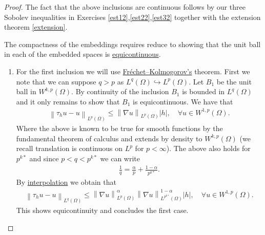 \documentclass[12pt]{article}
\theoremstyle{remark}
\renewcommand{\norm}[1]{\left\lVert #1 \right\rVert}\renewcommand{\abs}[1]{\left| #1 \right|}
\begin{document}
\begin{proof}
	The fact that the above inclusions are continuous follows by our three Sobolev inequalities in Exercises \ref{est12},\ref{est22},\ref{est32} together with the extension theorem \ref{extension}.

	The compactness of the embeddings requires reduce to showing that the unit ball in each of the embedded spaces is \href{https://en.wikipedia.org/wiki/Equicontinuity}{equicontinuous}.
	\begin{enumerate}
		\item     For the first inclusion we will use \href{https://en.wikipedia.org/wiki/Fr%C3%A9chet%E2%80%93Kolmogorov_theorem}{Fréchet–Kolmogorov's} theorem. First we note that we can suppose $q>p$ as  $L^q(\Omega) \hookrightarrow L^p(\Omega)$. Let $B_1$ be the unit ball in $W^{k,p}(\Omega)$. By continuity of the inclusion $B_1$ is bounded in $L^q(\Omega)$ and it only remains to show that  $B_1$ is equicontinuous. We have that
		      \begin{align*}
			      \norm{\tau_h u-u}_{L^p(\Omega)}\leq \norm{\nabla u}_{L^p(\Omega)}\abs{h} , \quad\forall u \in W^{1,p}(\Omega) .
		      \end{align*}
		      Where the above is known to be true for smooth functions by the fundamental theorem of calculus and extends by density to $W^{k,p}(\Omega)$ (we recall translation is continuous on $L^p$ for  $p<\infty$). The above also holds for $p^{k*}$ and since $p<q<p^{k*}$ we can write
		      \begin{align*}
			      \frac{1}{q}=\frac{\alpha}{p}+\frac{1-\alpha}{p^{k*}}   .
		      \end{align*}
		      By \href{https://en.wikipedia.org/wiki/Riesz%E2%80%93Thorin_theorem#:~:text=the%20sumset%20formulation.-,Riesz%E2%80%93Thorin,-interpolation%20theorem%C2%A0%E2%80%94%C2%A0}{interpolation} we obtain that
		      \begin{align*}
			      \norm{\tau_h u-u}_{L^q(\Omega)}\leq \norm{\nabla u}_{L^p(\Omega)}^\alpha\norm{\nabla u}_{L^{p^{k*}}(\Omega)}^{1-\alpha}\abs{h} , \quad\forall u \in W^{1,p}(\Omega) .
		      \end{align*}
		      This shows equicontinuity and concludes the first case.


\end{enumerate}
\end{proof}
\end{document}
